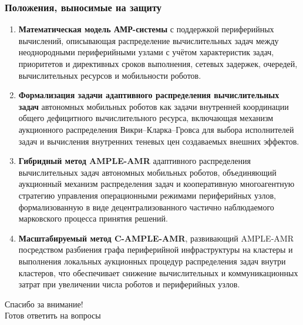 \begin{frame}
	\frametitle{Положения, выносимые на защиту}
	\scriptsize
	\begin{enumerate}
		\item \textbf{Математическая модель АМР-системы} с поддержкой периферийных вычислений, описывающая распределение вычислительных задач между неоднородными периферийными узлами с учётом характеристик задач, приоритетов и директивных сроков выполнения, сетевых задержек, очередей, вычислительных ресурсов и мобильности роботов.
		\item \textbf{Формализация задачи адаптивного распределения вычислительных задач} автономных мобильных роботов как задачи внутренней координации общего дефицитного вычислительного ресурса, включающая механизм аукционного распределения Викри–Кларка–Гровса для выбора исполнителей задач и вычисления внутренних теневых цен создаваемых внешних эффектов.
		\item \textbf{Гибридный метод AMPLE-AMR} адаптивного распределения вычислительных задач автономных мобильных роботов, объединяющий аукционный механизм распределения задач и кооперативную многоагентную стратегию управления операционными режимами периферийных узлов, формализованную в виде децентрализованного частично наблюдаемого марковского процесса принятия решений.
		\item \textbf{Масштабируемый метод C-AMPLE-AMR}, развивающий AMPLE-AMR посредством разбиения графа периферийной инфраструктуры на кластеры и выполнения локальных аукционных процедур распределения задач внутри кластеров, что обеспечивает снижение вычислительных и коммуникационных затрат при увеличении числа роботов и периферийных узлов.
	\end{enumerate}
\end{frame}

\begin{frame}
    \begin{center}
        \Huge Спасибо за внимание!\\[4mm]
        \large Готов ответить на вопросы
    \end{center}
\end{frame}
